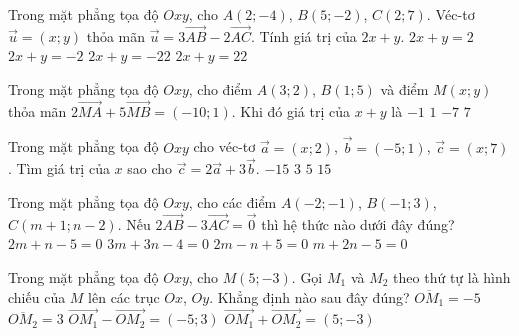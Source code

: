 \begin{ex}%
	Trong mặt phẳng tọa độ $Oxy$, cho $A(2;-4)$, $B(5;-2)$, $C(2;7)$. Véc-tơ $\vec{u}=(x;y)$ thỏa mãn $\vec{u}=3\vec{AB}-2\vec{AC}$. Tính giá trị của $2x+y$.
	\choice
	{\True  $2x+y=2$}
	{$2x+y=-2$}
	{$2x+y=-22$}
	{$2x+y=22$}
\end{ex}
\begin{ex}%
	Trong mặt phẳng tọa độ $Oxy$, cho điểm $A(3;2)$, $B(1;5)$  và điểm $M(x;y)$ thỏa mãn $2\vec{MA} + 5\vec{MB}=(-10;1)$. Khi đó giá trị của $x+y$ là
	\choice
	{$-1$}
	{$1$}
	{$-7$}
	{\True $7$}
\end{ex}
\begin{ex}%
	Trong mặt phẳng tọa độ $Oxy$ cho véc-tơ $\vec{a} =(x;2)$, $\vec{b} =(-5;1)$, $\vec{c}= (x;7)$. Tìm giá trị của $x$ sao cho $\vec{c} =2\vec{a} +3\vec{b}$.
	\choice
	{$-15$}
	{$3$}
	{$5$}
	{\True $15$}
\end{ex}
\begin{ex}%
	Trong mặt phẳng tọa độ $Oxy$, cho các điểm $A(-2;-1)$, $B(-1;3)$, $C(m+1;n-2)$. Nếu $2\vec{AB} -3\vec{AC} =\vec{0}$ thì hệ thức nào dưới đây đúng?
	\choice
	{$2m+n-5=0$}
	{\True $3m+3n-4=0$}
	{$2m-n+5=0$}
	{$m+2n-5=0$}
\end{ex}
\begin{ex}%
	Trong mặt phẳng tọa độ $Oxy$, cho $M(5;-3)$. Gọi $M_1$ và $M_2$ theo thứ tự là hình chiếu của $M$ lên các trục $Ox$, $Oy$. Khẳng định nào sau đây đúng?
	\choice
	{$\overline{OM_1}=-5$}
	{$\overline{OM_2}=3$}
	{$\vec{OM_1}-\vec{OM_2}=(-5;3)$}
	{\True $\vec{OM_1}+\vec{OM_2}=(5;-3)$}
\end{ex}
